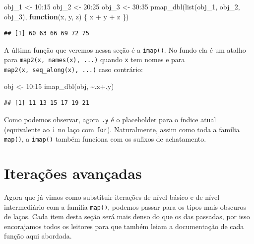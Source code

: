 \documentclass[
]{book}
\newenvironment{Shaded}{\begin{snugshade}}{\end{snugshade}}
\newcommand{\ControlFlowTok}[1]{\textcolor[rgb]{0.13,0.29,0.53}{\textbf{#1}}}
\newcommand{\DecValTok}[1]{\textcolor[rgb]{0.00,0.00,0.81}{#1}}
\newcommand{\FunctionTok}[1]{\textcolor[rgb]{0.00,0.00,0.00}{#1}}
\newcommand{\NormalTok}[1]{#1}
\newcommand{\OtherTok}[1]{\textcolor[rgb]{0.56,0.35,0.01}{#1}}
\newcommand{\SpecialCharTok}[1]{\textcolor[rgb]{0.00,0.00,0.00}{#1}}
\begin{document}
\begin{Shaded}
\begin{Highlighting}[]
\NormalTok{obj\_1 }\OtherTok{\textless{}{-}} \DecValTok{10}\SpecialCharTok{:}\DecValTok{15}
\NormalTok{obj\_2 }\OtherTok{\textless{}{-}} \DecValTok{20}\SpecialCharTok{:}\DecValTok{25}
\NormalTok{obj\_3 }\OtherTok{\textless{}{-}} \DecValTok{30}\SpecialCharTok{:}\DecValTok{35}
\FunctionTok{pmap\_dbl}\NormalTok{(}\FunctionTok{list}\NormalTok{(obj\_1, obj\_2, obj\_3), }\ControlFlowTok{function}\NormalTok{(x, y, z) \{ x }\SpecialCharTok{+}\NormalTok{ y }\SpecialCharTok{+}\NormalTok{ z \})}
\end{Highlighting}
\end{Shaded}

\begin{verbatim}
## [1] 60 63 66 69 72 75
\end{verbatim}

A última função que veremos nessa seção é a \texttt{imap()}. No fundo ela é um
atalho para \texttt{map2(x,\ names(x),\ ...)} quando \texttt{x} tem nomes e para
\texttt{map2(x,\ seq\_along(x),\ ...)} caso contrário:

\begin{Shaded}
\begin{Highlighting}[]
\NormalTok{obj }\OtherTok{\textless{}{-}} \DecValTok{10}\SpecialCharTok{:}\DecValTok{15}
\FunctionTok{imap\_dbl}\NormalTok{(obj, }\SpecialCharTok{\textasciitilde{}}\NormalTok{.x}\SpecialCharTok{+}\NormalTok{.y)}
\end{Highlighting}
\end{Shaded}

\begin{verbatim}
## [1] 11 13 15 17 19 21
\end{verbatim}

Como podemos observar, agora \texttt{.y} é o placeholder para o índice atual (equivalente
ao \texttt{i} no laço com \texttt{for}). Naturalmente, assim como toda a família \texttt{map()}, a
\texttt{imap()} também funciona com os sufixos de achatamento.

\hypertarget{iterauxe7uxf5es-avanuxe7adas}{%
\section{Iterações avançadas}\label{iterauxe7uxf5es-avanuxe7adas}}

Agora que já vimos como substituir iterações de nível básico e de nível
intermediário com a família \texttt{map()}, podemos passar para os tipos mais obscuros
de laços. Cada item desta seção será mais denso do que os das passadas, por isso
encorajamos todos os leitores para que também leiam a documentação de cada função
aqui abordada.
\end{document}
